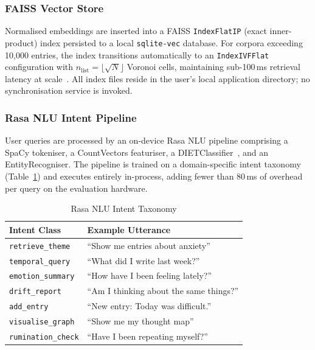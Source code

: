 \documentclass[12pt, letterpaper]{article}
\begin{document}
\subsubsection{FAISS Vector Store}
Normalised embeddings are inserted into a FAISS
\texttt{IndexFlatIP} (exact inner-product) index persisted to
a local \texttt{sqlite-vec} database.
For corpora exceeding 10,000 entries, the index transitions
automatically to an \texttt{IndexIVFFlat} configuration with
$n_{\mathrm{list}} = \lfloor\sqrt{N}\rfloor$ Voronoi cells,
maintaining sub-100\,ms retrieval latency at
scale~\cite{johnson2021faiss}.
All index files reside in the user's local application
directory; no synchronisation service is invoked.

\subsubsection{Rasa NLU Intent Pipeline}
User queries are processed by an on-device Rasa NLU pipeline
comprising a SpaCy tokeniser, a CountVectors featuriser, a
DIETClassifier~\cite{bunk2020diet}, and an EntityRecogniser.
The pipeline is trained on a domain-specific intent taxonomy
(Table~\ref{tab:intents}) and executes entirely in-process,
adding fewer than 80\,ms of overhead per query on the
evaluation hardware.

\begin{table}[htbp]
\centering
\caption{Rasa NLU Intent Taxonomy}
\label{tab:intents}
\begin{tabular}{ll}
\toprule
\textbf{Intent Class} & \textbf{Example Utterance} \\
\midrule
\texttt{retrieve\_theme}   & ``Show me entries about anxiety'' \\
\texttt{temporal\_query}   & ``What did I write last week?'' \\
\texttt{emotion\_summary}  & ``How have I been feeling lately?'' \\
\texttt{drift\_report}     & ``Am I thinking about the same things?'' \\
\texttt{add\_entry}        & ``New entry: Today was difficult.'' \\
\texttt{visualise\_graph}  & ``Show me my thought map'' \\
\texttt{rumination\_check} & ``Have I been repeating myself?'' \\
\bottomrule
\end{tabular}
\end{table}

\end{document}
